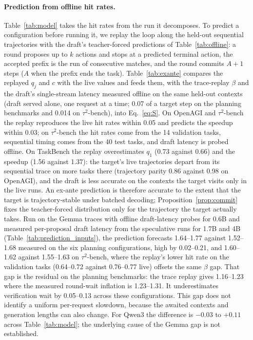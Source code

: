 \paragraph{Prediction from offline hit rates.}
Table~\ref{tab:model} takes the hit rates from the run it decomposes. To predict a configuration before
running it, we replay the loop along the held-out sequential trajectories with the draft's teacher-forced
predictions of Table~\ref{tab:offline}: a round proposes up to $k$ actions and stops at a predicted
terminal action, the accepted prefix is the run of consecutive matches, and the round commits $A{+}1$
steps ($A$ when the prefix ends the task). Table~\ref{tab:exante} compares the replayed $q_j$ and $c$
with the live values and feeds them, with the trace-replay $\beta$ and the draft's single-stream
latency measured offline on the same held-out contexts (draft served alone, one request at a time;
0.07 of a target step on the planning benchmarks and 0.014 on $\tau^2$-bench), into Eq.~\ref{eq:S}. On OpenAGI
and $\tau^2$-bench the replay reproduces the live hit rates within 0.05 and predicts the speedup within 0.03;
on $\tau^2$-bench the hit rates come from the 14 validation tasks, sequential timing comes from the 40 test tasks, and draft latency is probed offline. On
TaskBench the replay overestimates $q_1$ (0.73 against 0.66) and the speedup (1.56 against 1.37): the
target's live trajectories depart from its sequential trace on
more tasks there (trajectory parity 0.86 against 0.98 on OpenAGI), and the draft is less accurate on the
contexts the target visits only in the live runs. An ex-ante prediction is therefore accurate to the extent that
the target is trajectory-stable under batched decoding; Proposition~\ref{prop:commit} fixes the
teacher-forced distribution only for the trajectory the target actually takes. Run on the Gemma traces
with offline draft-latency probes for 0.6B and measured per-proposal draft latency from the speculative runs for 1.7B and 4B (Table~\ref{tab:prediction_inputs}), the prediction forecasts 1.64--1.77\xx{} against 1.52--1.68\xx{} measured
on the six planning configurations, high by 0.02--0.21, and 1.60--1.62\xx{} against 1.55--1.63\xx{} on
$\tau^2$-bench, where the replay's lower hit rate on the validation tasks (0.64--0.72 against 0.76--0.77
live) offsets the same $\beta$ gap. That gap is the residual on the planning benchmarks: the trace replay
gives 1.16--1.23 where the measured round-wait inflation is 1.23--1.31. It underestimates
verification wait by 0.05--0.13 across these configurations. This gap does not identify a uniform
per-request slowdown, because the awaited contexts and generation lengths can also change.
For Qwen3 the difference is $-0.03$ to $+0.11$ across Table~\ref{tab:model}; the underlying cause
of the Gemma gap is not established.

